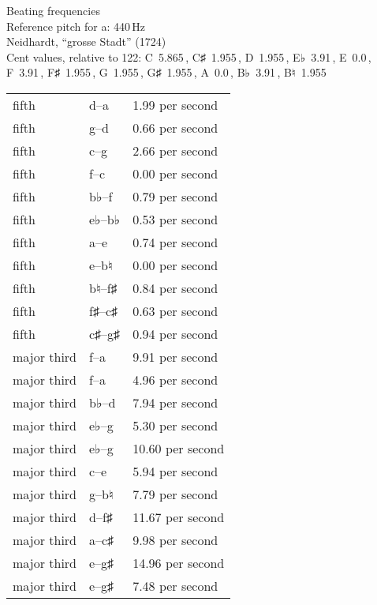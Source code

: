 \documentclass{standalone}
\def\str{\textquotesingle}
\def\cn{\textcent}
\begin{document}
\begin{minipage}{8cm}
\begin{center}
  {\Large Beating frequencies}\\[2ex]
  Reference pitch for a\str: 440\,Hz\\[1ex]
  Neidhardt, \enquote{grosse Stadt} (1724)\\[1ex]
  Cent values, relative to 122: C~5.865\,\cn, C♯~1.955\,\cn, D~1.955\,\cn, E♭~3.91\,\cn, E~0.0\,\cn, F~3.91\,\cn, F♯~1.955\,\cn, G~1.955\,\cn, G♯~1.955\,\cn, A~0.0\,\cn, B♭~3.91\,\cn, B♮~1.955\,\cn
\end{center}
\begin{longtable}{p{2cm}p{1cm}p{3cm}}
  \toprule
  fifth & d\str--a\str & 1.99 per second \\fifth & g--d\str & 0.66 per second \\fifth & c\str--g\str & 2.66 per second \\fifth & f--c\str & 0.00 per second \\fifth & b♭--f\str & 0.79 per second \\fifth & e♭--b♭ & 0.53 per second \\fifth & a--e\str & 0.74 per second \\fifth & e--b♮ & 0.00 per second \\fifth & b♮--f♯\str & 0.84 per second \\fifth & f♯--c♯\str & 0.63 per second \\fifth & c♯\str--g♯\str & 0.94 per second \\major third & f\str--a\str & 9.91 per second \\major third & f--a & 4.96 per second \\major third & b♭--d\str & 7.94 per second \\major third & e♭--g & 5.30 per second \\major third & e♭\str--g\str & 10.60 per second \\major third & c\str--e\str & 5.94 per second \\major third & g--b♮ & 7.79 per second \\major third & d\str--f♯\str & 11.67 per second \\major third & a--c♯\str & 9.98 per second \\major third & e\str--g♯\str & 14.96 per second \\major third & e--g♯ & 7.48 per second \\
  \bottomrule
\end{longtable}
\end{minipage}
\end{document}
